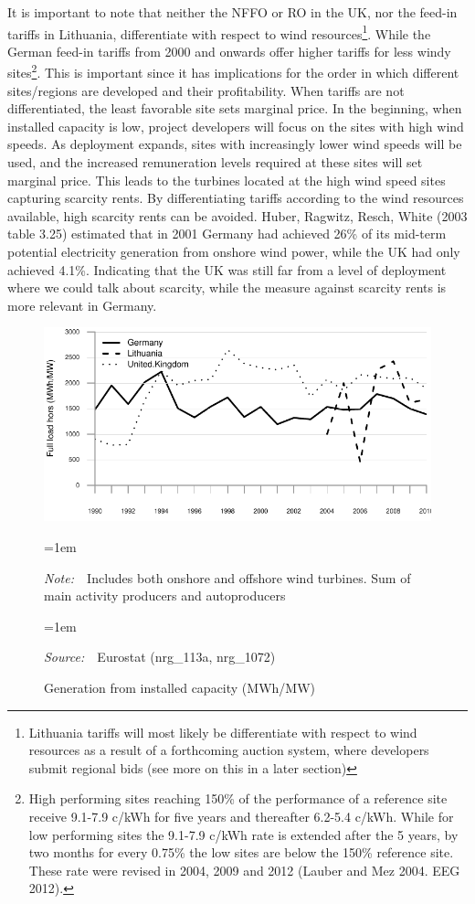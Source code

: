 \documentclass[a4paper, 12pt]{article}
\newcommand{\Figtext}[1]{%
	\begin{tablenotes}[para,flushleft]
		\hangindent=1em
		\footnotesize
		\raggedright
		#1
	\end{tablenotes}
}
\newcommand{\Fignote}[1]{\Figtext{\emph{Note:~}~#1}}
\newcommand{\Figsource}[1]{\Figtext{\emph{Source:~}~#1}}
\begin{document}
It is important to note that neither the NFFO or RO in the UK, nor the feed-in tariffs in Lithuania, differentiate with respect to wind resources\footnote{Lithuania tariffs will most likely be differentiate with respect to wind resources as a result of a forthcoming auction system, where developers submit regional bids (see more on this in a later section)}. While the German feed-in tariffs from 2000 and onwards offer higher tariffs for less windy sites\footnote{High performing sites reaching 150\% of the performance of a reference site receive 9.1-7.9 c/kWh for five years and thereafter 6.2-5.4 c/kWh. While for low performing sites the 9.1-7.9 c/kWh rate is extended after the 5 years, by two months for every 0.75\% the low sites are below the 150\% reference site. These rate were revised in 2004, 2009 and 2012 (Lauber and Mez 2004. EEG 2012).}. This is important since it has implications for the order in which different sites/regions are developed and their profitability. When tariffs are not differentiated, the least favorable site sets marginal price. In the beginning, when installed capacity is low, project developers will focus on the sites with high wind speeds. As deployment expands, sites with increasingly lower wind speeds will be used, and the increased remuneration levels required at these sites will set marginal price. This leads to the turbines located at the high wind speed sites capturing scarcity rents. By differentiating tariffs according to the wind resources available, high scarcity rents can be avoided. Huber, Ragwitz, Resch, White (2003 table 3.25) estimated that in 2001 Germany had achieved 26\% of its mid-term potential electricity generation from onshore wind power, while the UK had only achieved 4.1\%. Indicating that the UK was still far from a level of deployment where we could talk about scarcity, while the measure against scarcity rents is more relevant in Germany.

\begin{figure}
	\centering
	\caption{Generation from installed capacity (MWh/MW)}
	\includegraphics[width=1\textwidth]{figure_generation-capacity}
	\Fignote{Includes both onshore and offshore wind turbines. Sum of main activity producers and autoproducers}
	\Figsource{Eurostat (nrg\_113a, nrg\_1072)}
	\label{fig:figure_generation-capacity}
\end{figure}
\end{document}
